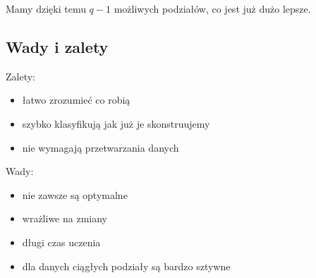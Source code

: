 Mamy dzięki temu \( q - 1 \) możliwych podziałów, co jest już dużo lepsze.

\subsection{Wady i zalety}

Zalety:
\begin{itemize}
	\item łatwo zrozumieć co robią
	\item szybko klasyfikują jak już je skonstruujemy
	\item nie wymagają przetwarzania danych
\end{itemize}
Wady:
\begin{itemize}
	\item nie zawsze są optymalne
	\item wrażliwe na zmiany
	\item długi czas uczenia
	\item dla danych ciągłych podziały są bardzo sztywne
\end{itemize}